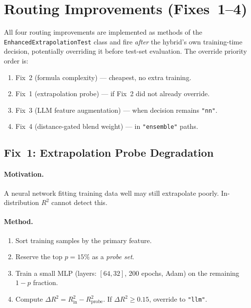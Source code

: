 \documentclass[twoside,11pt]{article}
\begin{document}
\section{Routing Improvements (Fixes~1--4)}
\label{sec:routing_fixes}

All four routing improvements are implemented as methods of the
\texttt{EnhancedExtrapolationTest} class and fire \emph{after} the hybrid's
own training-time decision, potentially overriding it before test-set
evaluation.  The override priority order is:

\begin{enumerate}
  \item Fix~2 (formula complexity) — cheapest, no extra training.
  \item Fix~1 (extrapolation probe) — if Fix~2 did not already override.
  \item Fix~3 (LLM feature augmentation) — when decision remains \texttt{"nn"}.
  \item Fix~4 (distance-gated blend weight) — in \texttt{"ensemble"} paths.
\end{enumerate}

\subsection{Fix~1: Extrapolation Probe Degradation}

\paragraph{Motivation.}
A neural network fitting training data well may still extrapolate poorly.
In-distribution $R^2$ cannot detect this.

\paragraph{Method.}

\begin{enumerate}
  \item Sort training samples by the primary feature.
  \item Reserve the top $p = 15\%$ as a \emph{probe set}.
  \item Train a small MLP (layers: $[64, 32]$, 200 epochs, Adam) on the
        remaining $1-p$ fraction.
  \item Compute $\Delta R^2 = R^2_{\text{in}} - R^2_{\text{probe}}$.
        If $\Delta R^2 \geq 0.15$, override to \texttt{"llm"}.
\end{enumerate}
\end{document}
